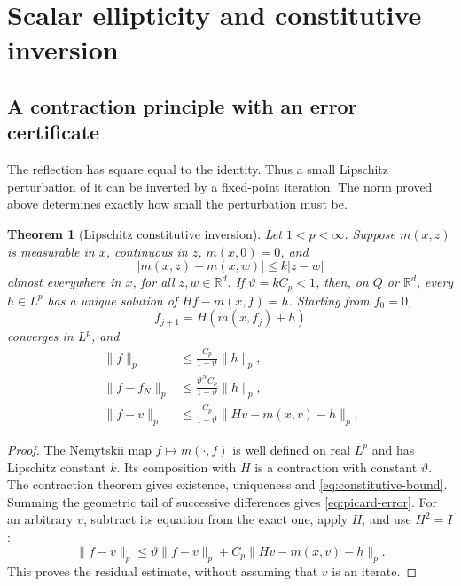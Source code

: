 \documentclass[11pt,a4paper]{article}
\numberwithin{equation}{section}
\newtheorem{theorem}{Theorem}[section]
\theoremstyle{definition}
\theoremstyle{remark}\newtheorem{remark}[theorem]{Remark}
\newcommand{\R}{\mathbb R}
\newcommand{\Id}{I}
\newcommand{\norm}[1]{\lVert #1\rVert}
\begin{document}


\section{Scalar ellipticity and constitutive inversion}\label{sec:elliptic}

\subsection{A contraction principle with an error certificate}

The reflection has square equal to the identity. Thus a small Lipschitz
perturbation of it can be inverted by a fixed-point iteration. The norm
proved above determines exactly how small the perturbation must be.

\begin{theorem}[Lipschitz constitutive inversion]\label{thm:constitutive}
Let \(1<p<\infty\). Suppose \(m(x,z)\) is measurable in \(x\), continuous
in \(z\), \(m(x,0)=0\), and
\[
 |m(x,z)-m(x,w)|\leq k|z-w|
\]
almost everywhere in \(x\), for all \(z,w\in\R^d\).
If \(\vartheta=kC_p<1\), then, on \(Q\) or \(\R^d\), every \(h\in L^p\)
has a unique solution of \(Hf-m(x,f)=h\). Starting from \(f_0=0\),
\[
 f_{j+1}=H(m(x,f_j)+h)
\]
converges in \(L^p\), and
\begin{align}
 \norm f_p&\leq\frac{C_p}{1-\vartheta}\norm h_p,\label{eq:constitutive-bound}\\
 \norm{f-f_N}_p&\leq
       \frac{\vartheta^NC_p}{1-\vartheta}\norm h_p,\label{eq:picard-error}\\
 \norm{f-v}_p&\leq
       \frac{C_p}{1-\vartheta}\norm{Hv-m(x,v)-h}_p.\label{eq:residual}
\end{align}
\end{theorem}

\begin{proof}
The Nemytskii map \(f\mapsto m(\cdot,f)\) is well defined on real \(L^p\)
and has Lipschitz constant \(k\). Its composition with \(H\) is a
contraction with constant \(\vartheta\). The contraction theorem gives existence,
uniqueness and \eqref{eq:constitutive-bound}. Summing the geometric
tail of successive differences gives \eqref{eq:picard-error}.
For an arbitrary \(v\), subtract its equation from the exact one,
apply \(H\), and use \(H^2=\Id\):
\[
 \norm{f-v}_p\leq \vartheta\norm{f-v}_p+
                   C_p\norm{Hv-m(x,v)-h}_p.
\]
This proves the residual estimate, without assuming that \(v\) is an iterate.
\end{proof}
\end{document}
